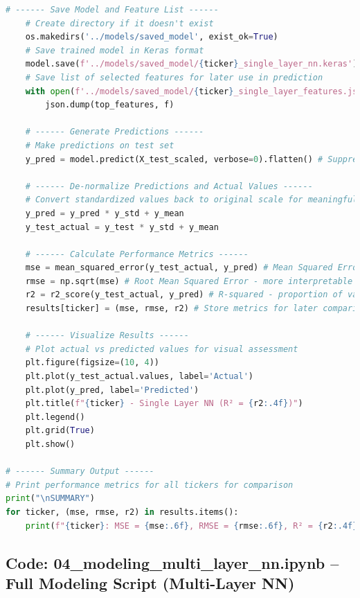 \documentclass[12pt]{article}
\begin{document}
\begin{lstlisting}[language=Python]
    # ------ Save Model and Feature List ------
    # Create directory if it doesn't exist
    os.makedirs('../models/saved_model', exist_ok=True)
    # Save trained model in Keras format
    model.save(f'../models/saved_model/{ticker}_single_layer_nn.keras')
    # Save list of selected features for later use in prediction
    with open(f'../models/saved_model/{ticker}_single_layer_features.json', 'w') as f:
        json.dump(top_features, f)
    
    # ------ Generate Predictions ------
    # Make predictions on test set
    y_pred = model.predict(X_test_scaled, verbose=0).flatten() # Suppress prediction output
    
    # ------ De-normalize Predictions and Actual Values ------
    # Convert standardized values back to original scale for meaningful evaluation
    y_pred = y_pred * y_std + y_mean
    y_test_actual = y_test * y_std + y_mean

    # ------ Calculate Performance Metrics ------
    mse = mean_squared_error(y_test_actual, y_pred) # Mean Squared Error
    rmse = np.sqrt(mse) # Root Mean Squared Error - more interpretable in original units
    r2 = r2_score(y_test_actual, y_pred) # R-squared - proportion of variance explained by model
    results[ticker] = (mse, rmse, r2) # Store metrics for later comparison

    # ------ Visualize Results ------
    # Plot actual vs predicted values for visual assessment
    plt.figure(figsize=(10, 4))
    plt.plot(y_test_actual.values, label='Actual')
    plt.plot(y_pred, label='Predicted')
    plt.title(f"{ticker} - Single Layer NN (R² = {r2:.4f})")
    plt.legend()
    plt.grid(True)
    plt.show()

# ------ Summary Output ------
# Print performance metrics for all tickers for comparison
print("\nSUMMARY")
for ticker, (mse, rmse, r2) in results.items():
    print(f"{ticker}: MSE = {mse:.6f}, RMSE = {rmse:.6f}, R² = {r2:.4f}")
\end{lstlisting}
\clearpage
\subsection*{Code: 04\_modeling\_multi\_layer\_nn.ipynb – Full Modeling Script (Multi-Layer NN)}
\end{document}
